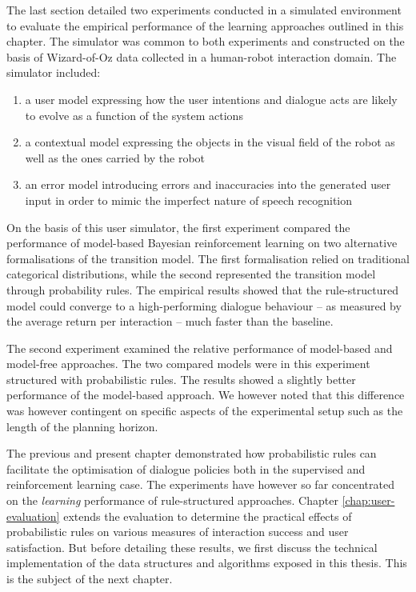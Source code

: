 The last section detailed two experiments conducted in a simulated environment to evaluate the empirical performance of the learning approaches outlined in this chapter. The simulator was common to both experiments and constructed on the basis of Wizard-of-Oz data collected in a human-robot interaction domain. The simulator included: \begin{enumerate}
\item a user model expressing how the user intentions and dialogue acts are likely to evolve as a function of the system actions
\item a contextual model expressing the objects in the visual field of the robot as well as the ones carried by the robot
\item an error model introducing errors and inaccuracies into the generated user input in order to mimic the imperfect nature of speech recognition
\end{enumerate}

On the basis of this user simulator, the first experiment compared the performance of model-based Bayesian reinforcement learning on two alternative formalisations of the transition model.  The first formalisation relied on traditional categorical distributions, while the second represented the transition model through probability rules. The empirical results showed that the rule-structured model could converge to a high-performing dialogue behaviour -- as measured by the average return per interaction -- much faster than the baseline.

The second experiment examined the relative performance of model-based and model-free approaches.  The two compared models were in this experiment structured with probabilistic rules. The results showed a slightly better performance of the model-based approach.  We however noted that this difference was however contingent on specific aspects of the experimental setup such as the length of the planning horizon. 

The previous and present chapter demonstrated how probabilistic rules can facilitate the optimisation of dialogue policies both in the supervised and reinforcement learning case. The experiments have however so far concentrated on the \textit{learning} performance of rule-structured approaches. Chapter \ref{chap:user-evaluation} extends the evaluation to determine the practical effects of probabilistic rules on various measures of interaction success and user satisfaction. But before detailing these results, we first discuss the technical implementation of the data structures and algorithms exposed in this thesis. This is the subject of the next chapter.
